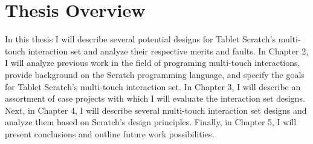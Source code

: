 \section{Thesis Overview}
In this thesis I will describe several potential designs for Tablet Scratch's multi-touch interaction set and analyze their respective merits and faults. In Chapter 2, I will analyze previous work in the field of programing multi-touch interactions, provide background on the Scratch programming language, and specify the goals for Tablet Scratch's multi-touch interaction set. In Chapter 3, I will describe an assortment of case projects with which I will evaluate the interaction set designs. Next, in Chapter 4, I will describe several multi-touch interaction set designs and analyze them based on Scratch's design principles. Finally, in Chapter 5, I will present conclusions and outline future work possibilities.


